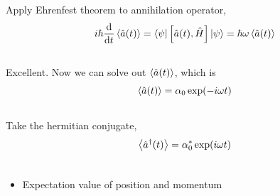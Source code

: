 \documentclass[letterpaper,10pt,english]{sphinxmanual}
\begin{document}
Apply Ehrenfest theorem to annihilation operator,
\begin{gather}
\begin{split}i\hbar \frac{\mathrm d}{\mathrm d t} \left< \hat a(t) \right> = \left\langle \psi\right| \left[ \hat a(t), \hat H \right] \left| \psi\right\rangle = \hbar \omega \left< \hat a(t) \right>\end{split}\notag\\\begin{split}\end{split}\notag
\end{gather}
Excellent. Now we can solve out $\left< \hat a(t) \right>$, which is
\begin{gather}
\begin{split}\left< \hat a(t) \right> = \alpha_0 \exp(-i\omega t)\end{split}\notag\\\begin{split}\end{split}\notag
\end{gather}
Take the hermitian conjugate,
\begin{gather}
\begin{split}\left< \hat a^\dagger (t) \right> = \alpha_0^* \exp(i\omega t)\end{split}\notag\\\begin{split}\end{split}\notag
\end{gather}\begin{itemize}
\item {} 
Expectation value of position and momentum

\end{itemize}
\end{document}
